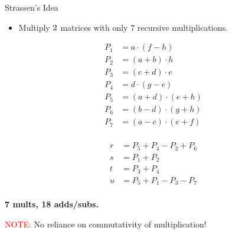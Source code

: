 \documentclass{beamer}
\newcommand{\toRight}[1]{
    \begin{FlushRight}
        {\small #1}
    \end{FlushRight}
}
\begin{document}
\begin{frame}{Strassen's Idea}
    \begin{itemize}
        \item Multiply $2 \time 2$ matrices with only 7 recursive multiplications.
    \end{itemize}
    \begin{minipage}{0.48\textwidth}
        \begin{equation*}
            \begin{split}
                P_1 &= a \cdot (f - h) \\
                P_2 &= (a + b) \cdot h \\
                P_3 &= (c + d) \cdot e \\
                P_4 &= d \cdot (g - e) \\
                P_5 &= (a + d) \cdot (e + h) \\
                P_6 &= (b - d) \cdot (g + h) \\
                P_7 &= (a - c) \cdot (e + f) \\
            \end{split}
        \end{equation*}
    \end{minipage} %
    \hfill
    \begin{minipage}{0.48\textwidth}
        \begin{equation*}
            \begin{split}
                r &= P_5 + P_4 - P_2 + P_6 \\
                s &= P_1 + P_2 \\
                t &= P_3 + P_4 \\
                u &= P_5 + P_1 - P_3 - P_7 \\
            \end{split}
        \end{equation*}
    \end{minipage}
    \toRight{\textbf{7 mults, 18 adds/subs.}}
    \begin{alertblock}{\textcolor{red}{NOTE:}}
        No reliance on commutativity of multiplication!
    \end{alertblock}
\end{frame}
\end{document}
